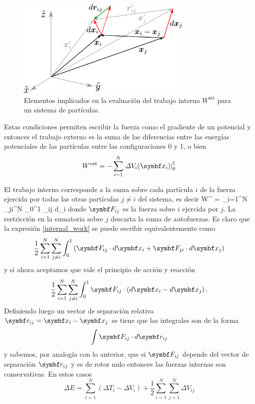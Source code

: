 \documentclass[10pt,oneside]{CBFT_book}
\begin{document}
\begin{figure}[!ht]
	\begin{center}
	\includegraphics[width=0.75\textwidth]{images/fig_mc_work_system.pdf}	
	\end{center}
	\caption{Elementos implicados en la evaluación del trabajo interno $ W^{\text{int}} $ para un sistema
	de partículas.}
	\label{fig_mc_work_system}
\end{figure} 

Estas condiciones permiten escribir la fuerza como el gradiente de un potencial y entonces el trabajo externo es la 
suma de las diferencias entre las energías potenciales de las partículas entre las configuraciones 0 y 1, o bien
\[
	W^{\text{ext}} = - \sum_{i=1}^N \left. \Delta V_i(\vb{x}_i) \right|_0^1
\]

El trabajo interno corresponde a la suma sobre cada partícula $i$ de la fuerza ejercida por todas las otras partículas 
$j \neq i$ del sistema, es decir
\be
	W^{} = \sum_{i=1}^N \sum_{j\neq i}^N \int_0^1 _{ij} \cdot d_i
	\label{internal_work}
\ee
donde $\vb{F}_{ij} $ es la fuerza sobre $i$ ejercida por $j$. La restricción en la sumatoria sobre $j$ descarta la suma 
de autofuerzas. Es claro que la expresión \eqref{internal_work} se puede escribir equivalentemente como
\[
	\frac{1}{2} \sum_{i=1}^N \sum_{j\neq i}^N \int_0^1 
	\left( \vb{F}_{ij} \cdot d\vb{x}_i + \vb{F}_{ji} \cdot d\vb{x}_j \right) 
\]
%
y si ahora aceptamos que vale el principio de acción y reacción
\[
	\frac{1}{2} \sum_{i=1}^N \sum_{j\neq i}^N \int_0^1 
	\vb{F}_{ij} \cdot \left(d\vb{x}_i - d\vb{x}_j \right) .
\]
Definiendo luego un vector de separación relativa $ \vb{r}_{ij} = \vb{x}_i - \vb{x}_j $ se tiene que las integrales son 
de la forma 
\[
	\int \vb{F}_{ij} \cdot d\vb{r}_{ij}
\]
y sabemos, por analogía con lo anterior, que si $\vb{F}_{ij}$ depende del vector de separación $ \vb{r}_{ij} $ y es de 
rotor nulo entonces las fuerzas internas son conservativas.
En estos casos
\[
	\Delta E = \sum_{i=1}^N ( \Delta T_i - \Delta V_i ) + \frac{1}{2} \sum_{i=1}^N \sum_{j=1}^N \Delta V_{ij}
\]
\end{document}

